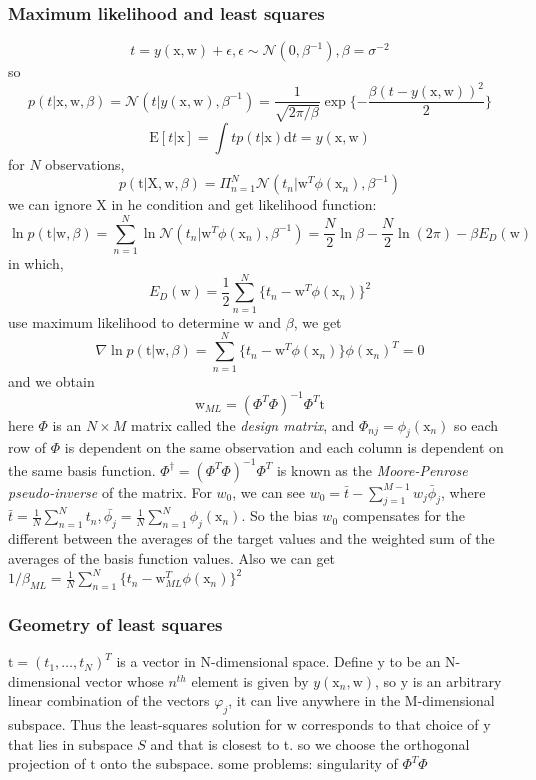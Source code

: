 \documentclass[a4paper]{book}
\begin{document}
\subsubsection{Maximum likelihood and least squares}
$$t = y(\mathrm x,\mathrm w)+\epsilon, \epsilon\sim\mathcal N(0,\beta^{-1}), \beta = \sigma^{-2}$$
so $$p(t|\mathrm x,\mathrm w,\beta) = \mathcal N(t|y(\mathrm x,\mathrm w),\beta^{-1})=\frac{1}{\sqrt{2\pi/\beta}}\exp\{-\frac{\beta(t-y(\mathrm x,\mathrm w))^2}{2}\}$$
$$\mathrm E[t|\mathrm x] =\int t p(t|\mathrm x)\mathrm dt=y(\mathrm x,\mathrm w)$$
for $N$ observations,
$$p(\mathrm t|\mathrm X,\mathrm w,\beta) = \Pi_{n=1}^N\mathcal N(t_n|\mathrm w^T\phi(\mathrm x_n), \beta^{-1})$$
we can ignore $\mathrm X$ in he condition and get likelihood function:
$$\ln p(\mathrm t|\mathrm w,\beta) = \sum_{n=1}^N\ln \mathcal N(t_n|\mathrm w^T\phi(\mathrm x_n),\beta^{-1}) = \frac N2\ln\beta-\frac N2\ln(2\pi)-\beta E_D(\mathrm w)$$
in which, $$E_D(\mathrm w) = \frac12\sum_{n=1}^N\{t_n-\mathrm w^T\phi(\mathrm x_n)\}^2$$
use maximum likelihood to determine $\mathrm w$ and $\beta$, we get
\begin{equation}\label{3.2.2}
  \nabla \ln p(\mathrm t|\mathrm w,\beta) = \sum_{n=1}^N\{t_n-\mathrm w^T\phi(\mathrm x_n)\}\phi(\mathrm x_n)^T = 0
\end{equation}
and we obtain
\begin{equation}\label{}
  \mathrm w_{ML} = (\Phi^T\Phi)^{-1}\Phi^T\mathrm t
\end{equation}
here $\Phi$ is an $N\times M$ matrix called the \textit{design matrix}, and $\Phi_{nj} = \phi_j(\mathrm x_n)$
so each row of $\Phi$ is dependent on the same observation and each column is dependent on the same basis function. \newline
$\Phi^{\dagger} = (\Phi^T\Phi)^{-1}\Phi^T$ is known as the \textit{Moore-Penrose pseudo-inverse} of the matrix.\newline
For $w_0$, we can see $w_0=\bar t-\sum_{j=1}^{M-1}w_j\bar \phi_j$, where $\bar t=\frac1N\sum_{n=1}^Nt_n, \bar{\phi_j}=\frac1N\sum_{n=1}^N\phi_j(\mathrm x_n)$. So the bias $w_0$ compensates for the different between the averages of the target values and the weighted sum of the averages of the basis function values. Also we can get$1/\beta_{ML}=\frac1N\sum_{n=1}^N\{t_n-\mathrm w_{ML}^T\phi(\mathrm x_n)\}^2$
\subsubsection{Geometry of least squares}
$\mathrm t=(t_1,\dots,t_N)^T$ is a vector in N-dimensional space. Define $\mathrm y$ to be an N-dimensional vector whose $n^{th}$ element is given by $y(\mathrm x_n,\mathrm w)$,  so $\mathrm y$ is an arbitrary linear combination of the vectors $\varphi_j$, it can live anywhere in the M-dimensional subspace.\newline
Thus the least-squares solution for $\mathrm  w $ corresponds to that choice of $\mathrm y$ that lies in subspace $S$ and that is closest to t. so we choose the orthogonal projection of $\mathrm t$  onto the subspace.\newline
some problems: singularity of $\Phi^T\Phi$
\end{document}
